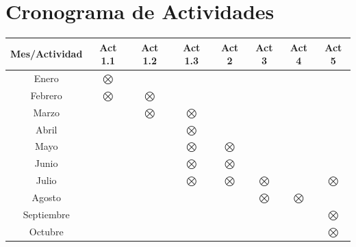 \documentclass[11pt]{article}
\begin{document}


\section{Cronograma de Actividades}	


\begin{center}
{\small
\begin{tabular}{|c|c|c|c|c|c|c|c|}
\hline

\textbf{Mes}/\textbf{Actividad}&\textbf{Act 1.1}&\textbf{Act 1.2}
&\textbf{Act 1.3}&\textbf{Act 2}&\textbf{Act 3}&\textbf{Act 4}&\textbf{Act 5}\\

\hline

Enero&$\bigotimes$&&&&&&\\

\hline

Febrero&$\bigotimes$&$\bigotimes$&&&&&\\

\hline

Marzo&&$\bigotimes$&$\bigotimes$&&&&\\

\hline

Abril&&&$\bigotimes$&&&&\\

\hline

Mayo&&&$\bigotimes$&$\bigotimes$&&&\\

\hline

Junio&&&$\bigotimes$&$\bigotimes$&&&\\

\hline
Julio&&&$\bigotimes$&$\bigotimes$&$\bigotimes$&&$\bigotimes$\\

\hline

Agosto&&&&&$\bigotimes$&$\bigotimes$&\\

\hline 

Septiembre&&&&&&&$\bigotimes$\\

\hline
Octubre&&&&&&&$\bigotimes$\\
\hline

\end{tabular}
}
\end{center}



\medskip







\end{document}
